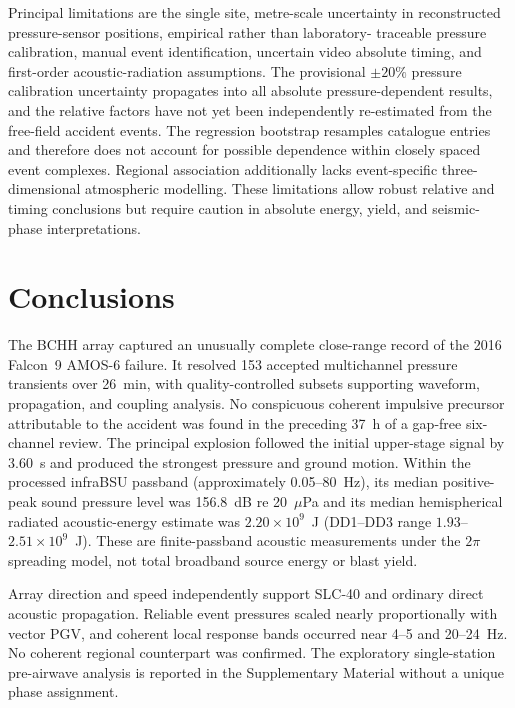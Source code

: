 \documentclass[]{seismica}
\begin{document}
Principal limitations are the single site, metre-scale uncertainty in
reconstructed pressure-sensor positions, empirical rather than laboratory-
traceable pressure calibration, manual event identification, uncertain video
absolute timing, and first-order acoustic-radiation assumptions. The provisional
$\pm20\%$ pressure calibration uncertainty propagates into all absolute
pressure-dependent results, and the relative factors have not yet been
independently re-estimated from the free-field accident events. The regression
bootstrap resamples catalogue entries and therefore does not account for
possible dependence within closely spaced event complexes. Regional
association additionally lacks event-specific three-dimensional atmospheric
modelling. These limitations allow robust relative and timing conclusions but
require caution in absolute energy, yield, and seismic-phase interpretations.

\section{Conclusions}
\label{sec:conclusions}

The BCHH array captured an unusually complete close-range record of the 2016
Falcon~9 AMOS-6 failure. It resolved 153 accepted multichannel pressure
transients over 26~min, with quality-controlled subsets supporting waveform,
propagation, and coupling analysis. No conspicuous coherent impulsive precursor
attributable to the accident was found in the preceding 37~h of a gap-free six-channel
review. The principal explosion followed
the initial upper-stage signal by 3.60~s and produced the strongest pressure
and ground motion. Within the processed infraBSU passband (approximately
0.05--80~Hz), its median positive-peak sound pressure level was 156.8~dB re
20~$\mu$Pa and its median hemispherical radiated acoustic-energy estimate was
$2.20\times10^9$~J (DD1--DD3 range $1.93$--$2.51\times10^9$~J). These are
finite-passband acoustic measurements under the $2\pi$ spreading model, not
total broadband source energy or blast yield.

Array direction and speed independently support SLC-40 and ordinary direct
acoustic propagation. Reliable event pressures scaled nearly proportionally
with vector PGV, and coherent local response bands occurred near 4--5 and
20--24~Hz. No coherent regional counterpart was confirmed. The exploratory
single-station pre-airwave analysis is reported in the Supplementary Material
without a unique phase assignment.
\end{document}
